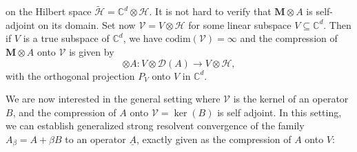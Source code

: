 \documentclass[reqno,12pt,letterpaper]{amsart}
\numberwithin{equation}{section}
\newcommand{\1}{\mathds{1}}
\theoremstyle{definition}
\begin{document}
 on the Hilbert space $\tilde{\mathscr{H}} = \mathds{C}^d \otimes \mathscr{H}$.
It is not hard to verify that $\mathbf{M} \otimes A$ is self-adjoint on its domain. Set now $\mathcal{V} = V \otimes \mathcal{H}$ for some linear subspace $V \subseteq \mathds{C}^{d}$. Then if $V$ is a true subspace of $\mathds{C}^d$, we have $\text{codim}(\mathcal{V}) = \infty$ and the compression of $\mathbf{M} \otimes A$ onto $\mathcal{V}$ is given by 
\begin{equation}
	[P_V\mathbf{M} P_V] \otimes A: V \otimes \mathcal{D}(A) \longrightarrow V  \otimes \mathscr{H},
\end{equation} 
 with the orthogonal projection $P_V$ onto $V$ in $\mathds{C}^d$.


We are now interested in the general setting where $\mathcal{V}$ is the kernel of an operator $B$, and the compression of $A$ onto $\mathcal{V} = \ker(B)$ is self adjoint. In this setting, we can establish generalized strong resolvent convergence of the family $A_\beta = A + \beta B$ to an operator $\underline{A}$, exactly given as the compression of $A$ onto $V$:
\end{document}
